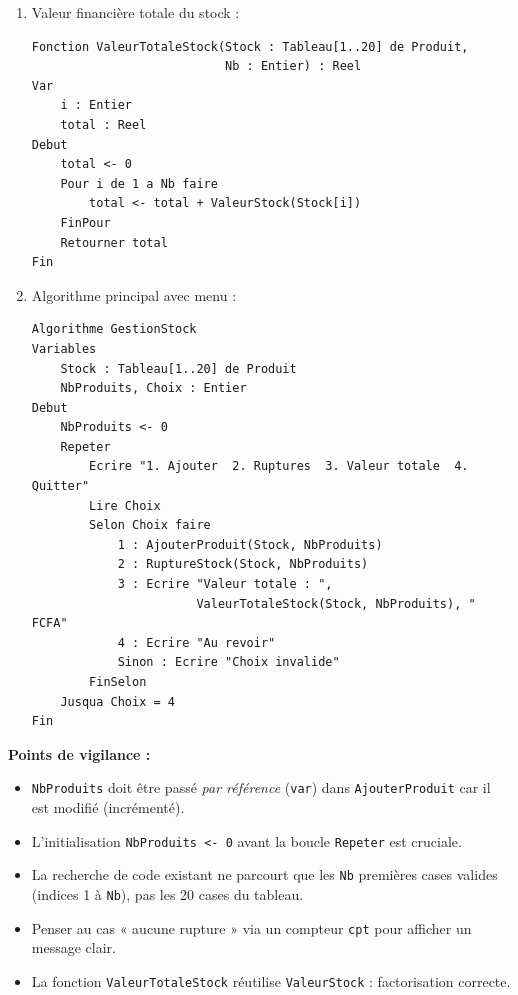 \documentclass[11pt]{article}
\begin{document}
\begin{corrige}
\begin{enumerate}
\begin{lstlisting}
        Si Stock[i].QuantiteStock = 0 Alors
            Ecrire Stock[i].Code, " - ", Stock[i].Designation
            cpt <- cpt + 1
        FinSi
    FinPour
    Si cpt = 0 Alors
        Ecrire "Aucune rupture"
    FinSi
Fin
\end{lstlisting}
    \item Valeur financière totale du stock :
\begin{lstlisting}
Fonction ValeurTotaleStock(Stock : Tableau[1..20] de Produit,
                           Nb : Entier) : Reel
Var
    i : Entier
    total : Reel
Debut
    total <- 0
    Pour i de 1 a Nb faire
        total <- total + ValeurStock(Stock[i])
    FinPour
    Retourner total
Fin
\end{lstlisting}
    \item Algorithme principal avec menu :
\begin{lstlisting}
Algorithme GestionStock
Variables
    Stock : Tableau[1..20] de Produit
    NbProduits, Choix : Entier
Debut
    NbProduits <- 0
    Repeter
        Ecrire "1. Ajouter  2. Ruptures  3. Valeur totale  4. Quitter"
        Lire Choix
        Selon Choix faire
            1 : AjouterProduit(Stock, NbProduits)
            2 : RuptureStock(Stock, NbProduits)
            3 : Ecrire "Valeur totale : ",
                       ValeurTotaleStock(Stock, NbProduits), " FCFA"
            4 : Ecrire "Au revoir"
            Sinon : Ecrire "Choix invalide"
        FinSelon
    Jusqua Choix = 4
Fin
\end{lstlisting}
\end{enumerate}
\textbf{Points de vigilance :}
\begin{itemize}
    \item \texttt{NbProduits} doit être passé \emph{par référence} (\texttt{var}) dans \texttt{AjouterProduit} car il est modifié (incrémenté).
    \item L'initialisation \texttt{NbProduits <- 0} avant la boucle \texttt{Repeter} est cruciale.
    \item La recherche de code existant ne parcourt que les \texttt{Nb} premières cases valides (indices 1 à \texttt{Nb}), pas les 20 cases du tableau.
    \item Penser au cas « aucune rupture » via un compteur \texttt{cpt} pour afficher un message clair.
    \item La fonction \texttt{ValeurTotaleStock} réutilise \texttt{ValeurStock} : factorisation correcte.
\end{itemize}
\end{corrige}
\end{document}
